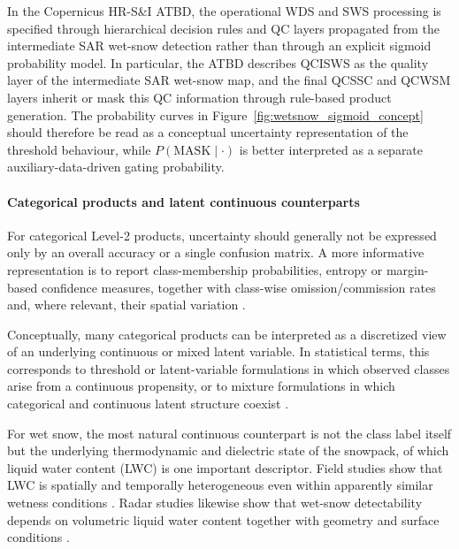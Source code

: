 \noindent In the Copernicus HR-S\&I ATBD, the operational WDS and SWS processing is
specified through hierarchical decision rules and QC layers propagated from the
intermediate SAR wet-snow detection rather than through an explicit sigmoid
probability model. In particular, the ATBD describes QCISWS as the quality
layer of the intermediate SAR wet-snow map, and the final QCSSC and QCWSM
layers inherit or mask this QC information through rule-based product
generation. The probability curves in Figure~\ref{fig:wetsnow_sigmoid_concept}
should therefore be read as a conceptual uncertainty representation of the
threshold behaviour, while $P(\mathrm{MASK}\mid\cdot)$ is better interpreted as a
separate auxiliary-data-driven gating probability.

\paragraph{Categorical products and latent continuous counterparts}

For categorical Level-2 products, uncertainty should generally not be expressed
only by an overall accuracy or a single confusion matrix. A more informative
representation is to report class-membership probabilities, entropy or margin-
based confidence measures, together with class-wise omission/commission rates
and, where relevant, their spatial variation \cite{ibrahim05,loosvelt12,comber12,roodposhti19}.

\noindent Conceptually, many categorical products can be interpreted as a discretized
view of an underlying continuous or mixed latent variable. In statistical terms,
this corresponds to threshold or latent-variable formulations in which observed
classes arise from a continuous propensity, or to mixture formulations in which
categorical and continuous latent structure coexist \cite{liu17,lubke08}.

\noindent For wet snow, the most natural continuous counterpart is not the class label
itself but the underlying thermodynamic and dielectric state of the snowpack,
of which liquid water content (LWC) is one important descriptor. Field studies
show that LWC is spatially and temporally heterogeneous even within apparently
similar wetness conditions \cite{techel11,bonnell21}. Radar studies likewise show
that wet-snow detectability depends on volumetric liquid water content together
with geometry and surface conditions \cite{magagi03}.

